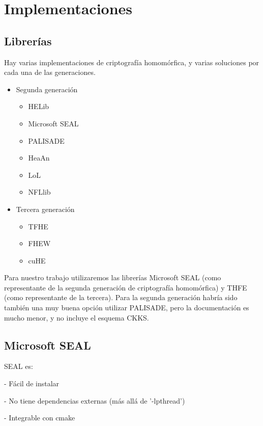 \chapter{Implementaciones}
\label{chap:libs}

\section{Librerías}

Hay varias implementaciones de criptografía homomórfica, y varias soluciones por cada una de las generaciones.

\begin{itemize}
    \item Segunda generación
    \begin{itemize}
        \item HELib
        \item Microsoft SEAL
        \item PALISADE
        \item HeaAn
        \item LoL
        \item NFLlib
    \end{itemize}
    \item Tercera generación
    \begin{itemize}
        \item TFHE
        \item FHEW
        \item cuHE
    \end{itemize}

\end{itemize}{}

Para nuestro trabajo utilizaremos las librerías Microsoft SEAL (como representante de la segunda generación de criptografía homomórfica) y THFE (como representante de la tercera). Para la segunda generación habría sido también una muy buena opción utilizar PALISADE, pero la documentación es mucho menor, y no incluye el esquema CKKS.

\section{Microsoft SEAL}
\label{tag:msfseal}

SEAL es:

- Fácil de instalar

- No tiene dependencias externas (más allá de '-lpthread')

- Integrable con cmake

